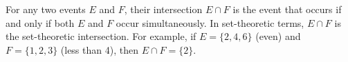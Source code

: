 For any two events $E$ and $F$, their intersection $E \cap F$ is the event that occurs if and only if both $E$ and $F$ occur simultaneously. In set-theoretic terms, $E \cap F$ is the set-theoretic intersection. For example, if $E = \{2,4,6\}$ (even) and $F = \{1,2,3\}$ (less than 4), then $E \cap F = \{2\}$.
